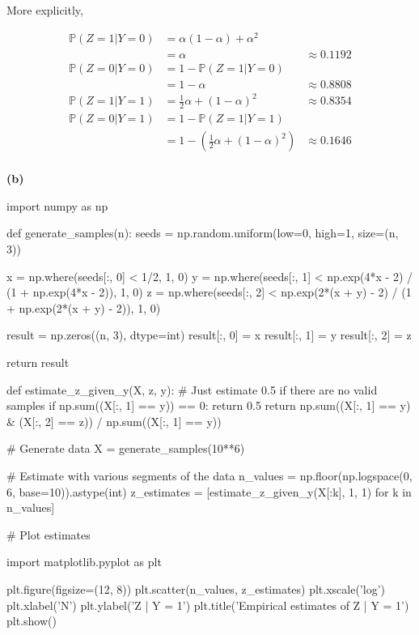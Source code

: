 More explicitly,

\begin{align*}
\mathbb{P}(Z = 1 | Y = 0) &= \alpha (1 - \alpha) + \alpha^{2} \\
&= \alpha  &\approx 0.1192 \\
\mathbb{P}(Z = 0 | Y = 0) &= 1 - \mathbb{P}(Z = 1 | Y = 0) \\
&= 1 - \alpha &\approx 0.8808\\
\mathbb{P}(Z = 1 | Y = 1) &= \frac{1}{2} \alpha + (1 - \alpha)^{2} &\approx 0.8354\\
\mathbb{P}(Z = 0 | Y = 1) &= 1 - \mathbb{P}(Z = 1 | Y = 1) \\
&= 1 - \left(\frac{1}{2} \alpha + (1 - \alpha)^{2} \right) &\approx 0.1646\\
\end{align*}

\textbf{(b)}

\begin{python}
import numpy as np

def generate_samples(n):
    seeds = np.random.uniform(low=0, high=1, size=(n, 3))
    
    x = np.where(seeds[:, 0] < 1/2, 1, 0)
    y = np.where(seeds[:, 1] < np.exp(4*x - 2) / (1 + np.exp(4*x - 2)), 1, 0)
    z = np.where(seeds[:, 2] < np.exp(2*(x + y) - 2) / (1 + np.exp(2*(x + y) - 2)), 1, 0)
    
    result = np.zeros((n, 3), dtype=int)
    result[:, 0] = x
    result[:, 1] = y
    result[:, 2] = z
    
    return result

def estimate_z_given_y(X, z, y):
    # Just estimate 0.5 if there are no valid samples
    if np.sum((X[:, 1] == y)) == 0:
        return 0.5
    return np.sum((X[:, 1] == y) & (X[:, 2] == z)) / np.sum((X[:, 1] == y))
\end{python}

\begin{python}
# Generate data
X = generate_samples(10**6)
\end{python}

\begin{python}
# Estimate with various segments of the data
n_values = np.floor(np.logspace(0, 6, base=10)).astype(int)
z_estimates = [estimate_z_given_y(X[:k], 1, 1) for k in n_values]
\end{python}

\begin{python}
# Plot estimates

import matplotlib.pyplot as plt

plt.figure(figsize=(12, 8))
plt.scatter(n_values, z_estimates)
plt.xscale('log')
plt.xlabel('N')
plt.ylabel('Z | Y = 1')
plt.title('Empirical estimates of Z | Y = 1')
plt.show()
\end{python}

